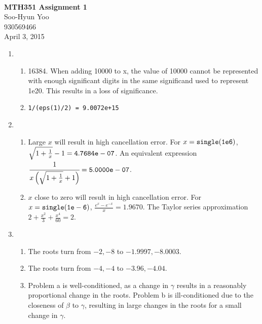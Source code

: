 \documentclass[12pt,letterpaper]{article}
\begin{document}
\fancyfoot{}
\begin{center}
  \hfill \\
  \vspace{4in}
  {\bf\Huge MTH351 Assignment 1} \\
  \vspace{2in}
  {\Large Soo-Hyun Yoo \\ 930569466 \\ April 3, 2015}
\end{center}

\newpage
{}

\begin{enumerate}
  \item
    \begin{enumerate}
      \item 16384. When adding 10000 to x, the value of 10000 cannot be
        represented with enough significant digits in the same significand used
        to represent 1e20. This results in a loss of significance.
      \item {\tt 1/(eps(1)/2) = 9.0072e+15}
    \end{enumerate}
  \item
    \begin{enumerate}
      \item Large $x$ will result in high cancellation error. For
        $x={\tt single(1e6)}$, $\sqrt{1+\frac{1}{x}}-1 = {\tt 4.7684e-07}$. An
        equivalent expression $\cfrac{1}{x\left(\sqrt{1+\frac{1}{x}}+1\right)}
        = {\tt
        5.0000e-07}$.
      \item $x$ close to zero will result in high cancellation error. For
        $x={\tt single(1e-6)}$, $\frac{e^x-e^{-x}}{x} = 1.9670$. The Taylor
        series approximation $2+\frac{x^2}{3}+\frac{x^4}{60} = 2$.
    \end{enumerate}
  \item
    \begin{enumerate}
      \item The roots turn from $-2, -8$ to $-1.9997, -8.0003$.
      \item The roots turn from $-4, -4$ to $-3.96, -4.04$.
      \item Problem a is well-conditioned, as a change in $\gamma$ results in
        a reasonably proportional change in the roots. Problem b is
        ill-conditioned due to the closeness of $\beta$ to $\gamma$, resulting
        in large changes in the roots for a small change in $\gamma$.
    \end{enumerate}

\end{enumerate}
\end{document}
